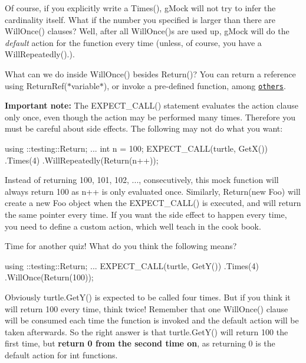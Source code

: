 Of course, if you explicitly write a {\ttfamily Times()}, g\+Mock will not try to infer the cardinality itself. What if the number you specified is larger than there are {\ttfamily Will\+Once()} clauses? Well, after all {\ttfamily Will\+Once()}s are used up, g\+Mock will do the {\itshape default} action for the function every time (unless, of course, you have a {\ttfamily Will\+Repeatedly()}.).

What can we do inside {\ttfamily Will\+Once()} besides {\ttfamily Return()}? You can return a reference using {\ttfamily Return\+Ref(}$\ast${\ttfamily variable}$\ast${\ttfamily )}, or invoke a pre-\/defined function, among \href{gmock_cook_book.md#using-actions}{\tt others}.

{\bfseries Important note\+:} The {\ttfamily E\+X\+P\+E\+C\+T\+\_\+\+C\+A\+L\+L()} statement evaluates the action clause only once, even though the action may be performed many times. Therefore you must be careful about side effects. The following may not do what you want\+:


\begin{DoxyCode}
using ::testing::Return;
...
int n = 100;
EXPECT\_CALL(turtle, GetX())
    .Times(4)
    .WillRepeatedly(Return(n++));
\end{DoxyCode}


Instead of returning 100, 101, 102, ..., consecutively, this mock function will always return 100 as {\ttfamily n++} is only evaluated once. Similarly, {\ttfamily Return(new Foo)} will create a new {\ttfamily Foo} object when the {\ttfamily E\+X\+P\+E\+C\+T\+\_\+\+C\+A\+L\+L()} is executed, and will return the same pointer every time. If you want the side effect to happen every time, you need to define a custom action, which we\textquotesingle{}ll teach in the cook book.

Time for another quiz! What do you think the following means?


\begin{DoxyCode}
using ::testing::Return;
...
EXPECT\_CALL(turtle, GetY())
    .Times(4)
    .WillOnce(Return(100));
\end{DoxyCode}


Obviously {\ttfamily turtle.\+Get\+Y()} is expected to be called four times. But if you think it will return 100 every time, think twice! Remember that one {\ttfamily Will\+Once()} clause will be consumed each time the function is invoked and the default action will be taken afterwards. So the right answer is that {\ttfamily turtle.\+Get\+Y()} will return 100 the first time, but {\bfseries return 0 from the second time on}, as returning 0 is the default action for {\ttfamily int} functions.

